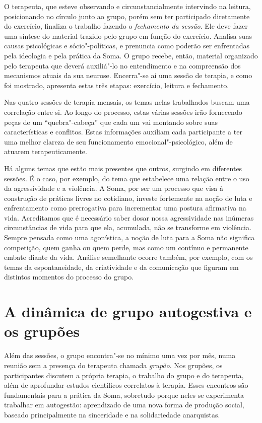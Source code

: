 O terapeuta, que esteve observando e circunstancialmente intervindo na
leitura, posicionando no círculo junto ao grupo, porém sem ter
participado diretamente do exercício, finaliza o trabalho fazendo o
\emph{fechamento da sessão}. Ele deve fazer uma síntese do material
trazido pelo grupo em função do exercício. Analisa suas causas
psicológicas e sócio"-políticas, e prenuncia como poderão ser enfrentadas
pela ideologia e pela prática da Soma. O grupo recebe, então, material
organizado pelo terapeuta que deverá auxiliá"-lo no entendimento e na
compreensão dos mecanismos atuais da sua neurose. Encerra"-se aí uma
sessão de terapia, e como foi mostrado, apresenta estas três etapas:
exercício, leitura e fechamento.

Nas quatro sessões de terapia mensais, os temas nelas trabalhados buscam
uma correlação entre si. Ao longo do processo, estas várias sessões irão
fornecendo peças de um ``quebra"-cabeça'' que cada um vai montando sobre
suas características e conflitos. Estas informações auxiliam cada
participante a ter uma melhor clareza de seu funcionamento
emocional"-psicológico, além de atuarem terapeuticamente.

Há alguns temas que estão mais presentes que outros, surgindo em
diferentes sessões. É o caso, por exemplo, do tema que estabelece uma
relação entre o uso da agressividade e a violência. A Soma, por ser um
processo que visa à construção de práticas livres no cotidiano, investe
fortemente na noção de luta e enfrentamento como prerrogativa para
incrementar uma postura afirmativa na vida. Acreditamos que é necessário
saber dosar nossa agressividade nas inúmeras circunstâncias de vida para
que ela, acumulada, não se transforme em violência. Sempre pensada como
uma agonística, a noção de luta para a Soma não significa competição,
quem ganha ou quem perde, mas como um contínuo e permanente embate
diante da vida. Análise semelhante ocorre também, por exemplo, com os
temas da espontaneidade, da criatividade e da comunicação que figuram em
distintos momentos do processo do grupo.

\section{A dinâmica de grupo autogestiva e os grupões}

Além das sessões, o grupo encontra"-se no mínimo uma vez por mês, numa
reunião sem a presença do terapeuta chamada \emph{grupão}. Nos grupões,
os participantes discutem a própria terapia, o trabalho do grupo e do
terapeuta, além de aprofundar estudos científicos correlatos à terapia.
Esses encontros são fundamentais para a prática da Soma, sobretudo
porque neles se experimenta trabalhar em autogestão: aprendizado de uma
nova forma de produção social, baseado principalmente na sinceridade e
na solidariedade anarquistas.

